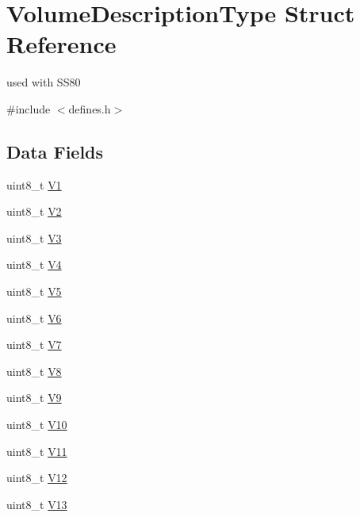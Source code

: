\hypertarget{structVolumeDescriptionType}{}\section{Volume\+Description\+Type Struct Reference}
\label{structVolumeDescriptionType}


used with S\+S80  




{\ttfamily \#include $<$defines.\+h$>$}

\subsection*{Data Fields}
\begin{DoxyCompactItemize}
\item 
uint8\+\_\+t \hyperlink{structVolumeDescriptionType_a179b7af780dd2a93dcb095d12690f6fa}{V1}
\item 
uint8\+\_\+t \hyperlink{structVolumeDescriptionType_a0c89f2c3b579944fb549107411d97213}{V2}
\item 
uint8\+\_\+t \hyperlink{structVolumeDescriptionType_a2a6a98d42bff4b72a02f562f1be113d2}{V3}
\item 
uint8\+\_\+t \hyperlink{structVolumeDescriptionType_ad10e9650afd43567c2b3b709d72f5dec}{V4}
\item 
uint8\+\_\+t \hyperlink{structVolumeDescriptionType_a986e346428396e0c131a9f200f472716}{V5}
\item 
uint8\+\_\+t \hyperlink{structVolumeDescriptionType_a3f925228651ced5c0e7c373ec6573162}{V6}
\item 
uint8\+\_\+t \hyperlink{structVolumeDescriptionType_a5d057bc3e9f6537234dfb904c740c68f}{V7}
\item 
uint8\+\_\+t \hyperlink{structVolumeDescriptionType_a86597a2edf96558d4176afc6ac3a0565}{V8}
\item 
uint8\+\_\+t \hyperlink{structVolumeDescriptionType_a8db8489c65036975ec2ebe01734310be}{V9}
\item 
uint8\+\_\+t \hyperlink{structVolumeDescriptionType_ac75ed59ba452ed86278e43e6fc5adec1}{V10}
\item 
uint8\+\_\+t \hyperlink{structVolumeDescriptionType_ad9ead8ed6e1eff85d9f1fde20c0ba60d}{V11}
\item 
uint8\+\_\+t \hyperlink{structVolumeDescriptionType_a96c6874117e4b64341e6c207bde061ae}{V12}
\item 
uint8\+\_\+t \hyperlink{structVolumeDescriptionType_ad3a75e21b674eadfa0db9d9df9672e16}{V13}
\end{DoxyCompactItemize}


